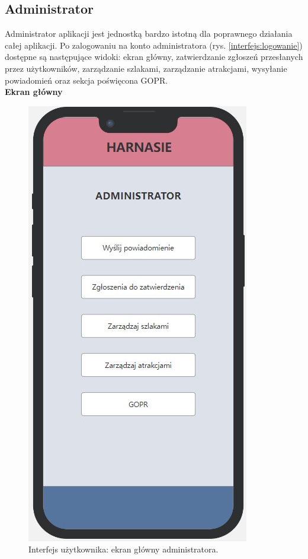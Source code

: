     \subsection*{Administrator}
    Administrator aplikacji jest jednostką bardzo istotną dla poprawnego działania całej aplikacji. Po zalogowaniu na konto administratora (rys. \ref{interfejs:logowanie}) dostępne są następujące widoki: ekran główny, zatwierdzanie zgłoszeń przesłanych przez użytkowników, zarządzanie szlakami, zarządzanie atrakcjami, wysyłanie powiadomień oraz sekcja poświęcona GOPR.\\
    \textbf{Ekran główny}
     \begin{figure}[H]
        \centering
        \includegraphics[scale=0.5]{img/interfejsy/if_admin.jpg}
        \caption{Interfejs użytkownika: ekran główny administratora.}
        \label{interfejs:admin}
    \end{figure}
